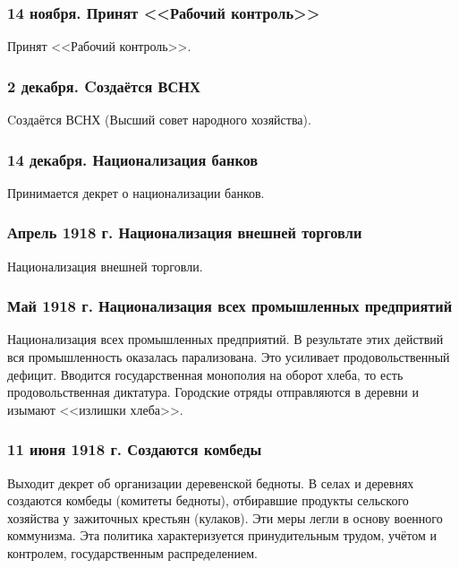 \subsubsection{\textbf{14 ноября. Принят <<Рабочий контроль>>}}

Принят <<Рабочий контроль>>.

\subsubsection{\textbf{2 декабря. Cоздаётся ВСНХ}}

Cоздаётся ВСНХ (Высший совет народного хозяйства).

\subsubsection{\textbf{14 декабря. Национализация банков}}

Принимается декрет о национализации банков.

\subsubsection{\textbf{Апрель 1918 г. Национализация внешней торговли}}

Национализация внешней торговли.

\subsubsection{\textbf{Май 1918 г. Национализация всех промышленных предприятий}}

Национализация всех промышленных предприятий. В результате этих действий вся промышленность оказалась парализована. Это усиливает продовольственный дефицит. Вводится государственная монополия на оборот хлеба, то есть продовольственная диктатура. Городские отряды отправляются в деревни и изымают <<излишки хлеба>>.

\subsubsection{\textbf{11 июня 1918 г. Создаются комбеды}}

Выходит декрет об организации деревенской бедноты. В селах и деревнях создаются комбеды (комитеты бедноты), отбиравшие продукты сельского хозяйства у зажиточных крестьян (кулаков). Эти меры легли в основу военного коммунизма. Эта политика характеризуется принудительным трудом, учётом и контролем, государственным распределением.


